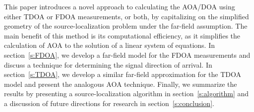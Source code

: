 This paper introduces a novel approach to calculating the AOA/DOA using either TDOA or FDOA measurements, or both, by capitalizing on the simplified geometry of the source-localization problem under the far-field assumption. The main benefit of this method is its computational efficiency, as it simplifies the calculation of AOA to the solution of a linear system of equations. In section~\ref{s:FDOA}, we develop a far-field model for the FDOA measurements and discuss a technique for determining the signal direction of arrival. In section~\ref{s:TDOA}, we develop a similar far-field approximation for the TDOA model and present the analogous AOA technique. Finally, we summarize the results by presenting a source-localization algorithm in section~\ref{s:algorithm} and a discussion of future directions for research in section~\ref{s:conclusion}.
